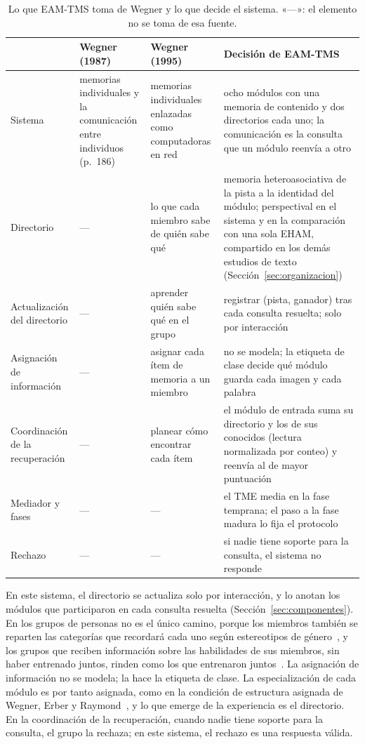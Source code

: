 \begin{table}[H]
\centering
\caption[Lo que EAM-TMS toma de Wegner y lo que decide el sistema]{Lo que EAM-TMS toma de Wegner y lo que decide el sistema.
«---»: el elemento no se toma de esa fuente.}
\label{tab:wegner-sistema}
\small
\setlength{\tabcolsep}{4pt}
\begin{tabular}{@{}p{2.6cm}p{3.1cm}p{3.6cm}p{5.6cm}@{}}
\toprule
& \textbf{Wegner (1987)} & \textbf{Wegner (1995)} & \textbf{Decisión de EAM-TMS} \\
\midrule
Sistema & memorias individuales y la comunicación entre individuos (p.~186) &
  memorias individuales enlazadas como computadoras en red &
  ocho módulos con una memoria de contenido y dos directorios cada uno; la
  comunicación es la consulta que un módulo reenvía a otro \\
Directorio & --- & lo que cada miembro sabe de quién sabe qué &
  memoria heteroasociativa de la pista a la identidad del módulo; perspectival en el
  sistema y en la comparación con una sola EHAM, compartido en los demás estudios de
  texto (Sección~\ref{sec:organizacion}) \\
Actualización del directorio & --- & aprender quién sabe qué en el grupo &
  registrar (pista, ganador) tras cada consulta resuelta; solo por interacción \\
Asignación de información & --- & asignar cada ítem de memoria a un miembro &
  no se modela; la etiqueta de clase decide qué módulo guarda cada imagen y cada palabra \\
Coordinación de la recuperación & --- & planear cómo encontrar cada ítem &
  el módulo de entrada suma su directorio y los de sus conocidos (lectura normalizada
  por conteo) y reenvía al de mayor puntuación \\
Mediador y fases & --- & --- &
  el TME media en la fase temprana; el paso a la fase madura lo fija el protocolo \\
Rechazo & --- & --- &
  si nadie tiene soporte para la consulta, el sistema no responde \\
\bottomrule
\end{tabular}
\end{table}

En este sistema, el directorio se actualiza solo por interacción, y lo anotan los
módulos que participaron en cada consulta resuelta (Sección~\ref{sec:componentes}).
En los grupos de personas no es el único camino, porque los miembros también se
reparten las categorías que recordará cada uno según estereotipos de
género~\cite{hollingshead2003gender}, y los grupos que reciben información sobre las
habilidades de sus miembros, sin haber entrenado juntos, rinden como los que entrenaron
juntos~\cite{moreland2000exploring}.
La asignación de información no se modela; la hace la etiqueta de clase.
La especialización de cada módulo es por tanto asignada, como en la condición de
estructura asignada de Wegner, Erber y Raymond~\cite{wegner1991transactive}, y lo que
emerge de la experiencia es el directorio.
En la coordinación de la recuperación, cuando nadie tiene soporte para la consulta, el
grupo la rechaza; en este sistema, el rechazo es una respuesta válida.

